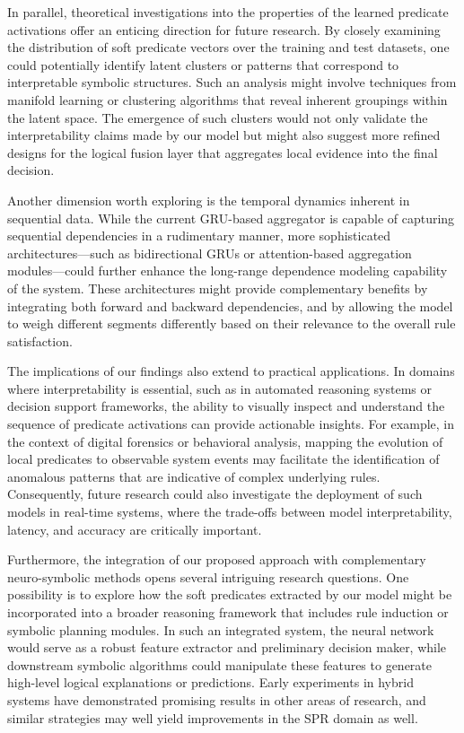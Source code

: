 \documentclass[11pt]{article}
\begin{document}
In parallel, theoretical investigations into the properties of the learned predicate activations offer an enticing direction for future research. By closely examining the distribution of soft predicate vectors over the training and test datasets, one could potentially identify latent clusters or patterns that correspond to interpretable symbolic structures. Such an analysis might involve techniques from manifold learning or clustering algorithms that reveal inherent groupings within the latent space. The emergence of such clusters would not only validate the interpretability claims made by our model but might also suggest more refined designs for the logical fusion layer that aggregates local evidence into the final decision.

Another dimension worth exploring is the temporal dynamics inherent in sequential data. While the current GRU-based aggregator is capable of capturing sequential dependencies in a rudimentary manner, more sophisticated architectures—such as bidirectional GRUs or attention-based aggregation modules—could further enhance the long-range dependence modeling capability of the system. These architectures might provide complementary benefits by integrating both forward and backward dependencies, and by allowing the model to weigh different segments differently based on their relevance to the overall rule satisfaction.

The implications of our findings also extend to practical applications. In domains where interpretability is essential, such as in automated reasoning systems or decision support frameworks, the ability to visually inspect and understand the sequence of predicate activations can provide actionable insights. For example, in the context of digital forensics or behavioral analysis, mapping the evolution of local predicates to observable system events may facilitate the identification of anomalous patterns that are indicative of complex underlying rules. Consequently, future research could also investigate the deployment of such models in real-time systems, where the trade-offs between model interpretability, latency, and accuracy are critically important.

Furthermore, the integration of our proposed approach with complementary neuro-symbolic methods opens several intriguing research questions. One possibility is to explore how the soft predicates extracted by our model might be incorporated into a broader reasoning framework that includes rule induction or symbolic planning modules. In such an integrated system, the neural network would serve as a robust feature extractor and preliminary decision maker, while downstream symbolic algorithms could manipulate these features to generate high-level logical explanations or predictions. Early experiments in hybrid systems have demonstrated promising results in other areas of research, and similar strategies may well yield improvements in the SPR domain as well.
\end{document}

